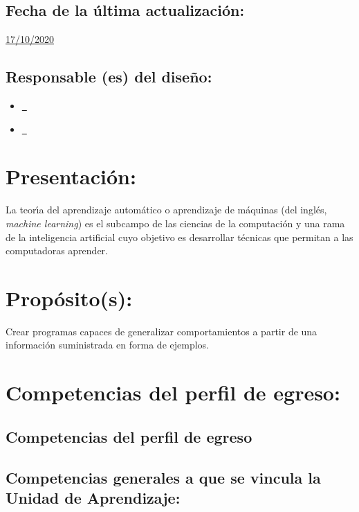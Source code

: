 \documentclass[10 pt]{article}
\begin{document}
\subsection{Fecha de la \'{u}ltima actualizaci\'{o}n:} \underline{17/10/2020}
\subsection{Responsable (es) del dise\~{n}o:}
\begin{itemize}[label={}]
\item \underline{\narturo~\arturo}
\item \underline{\nelisa~\elisa}
\end{itemize}

\newpage

\section{Presentaci\'{o}n:}

La teor\'{\i}a del aprendizaje autom\'{a}tico o aprendizaje de m\'{a}quinas (del
ingl\'{e}s, {\em machine learning}) es el subcampo de las ciencias de la
computaci\'{o}n y una rama de la inteligencia artificial cuyo objetivo es
desarrollar t\'{e}cnicas que permitan a las computadoras aprender.



\section{Prop\'{o}sito(s):}

Crear programas capaces de generalizar comportamientos a partir de una
informaci\'{o}n suministrada en forma de ejemplos.


\section{Competencias del perfil de egreso:}

\subsection{Competencias del perfil de egreso}




  
\subsection{Competencias generales a que se vincula la Unidad de
    Aprendizaje:}
\end{document}
